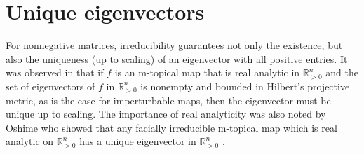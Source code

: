 \documentclass[10pt,reqno]{amsart}
\newcommand{\R}{\mathbb{R}}
\theoremstyle{plain}
\theoremstyle{definition}
\numberwithin{equation}{section}
\begin{document}
%


\section{Unique eigenvectors} \label{sec:unique}

For nonnegative matrices, irreducibility guarantees not only the existence, but also the uniqueness (up to scaling) of an eigenvector with all positive entries.  It was observed in \cite[Theorem 5.1]{Lins23} that if $f$ is an m-topical map that is real analytic in $\R^n_{>0}$ and the set of eigenvectors of $f$ in $\R^n_{>0}$ is nonempty and bounded in Hilbert's projective metric, as is the case for imperturbable maps, then the eigenvector must be unique up to scaling.  The importance of real analyticity was also noted by Oshime who showed that any facially irreducible m-topical map which is real analytic on $\R^n_{>0}$ has a unique eigenvector in $\R^n_{>0}$ \cite[Proposition 3.9]{Oshime92}.  
\end{document}
